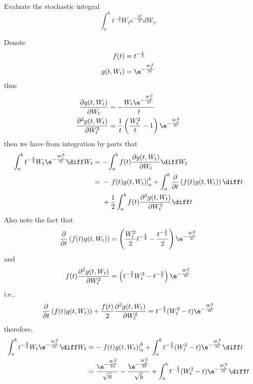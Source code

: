     \problem
    \begin{question}
        Evaluate the stochastic integral \[\int_a^b t^{-\frac{3}{2}}W_te^{-\frac{W^2_t}{2t}}dW_t.\]
    \end{question}
    Denote
    \[\begin{aligned}
        f(t)&=t^{-\frac{1}{2}}\\
        g(t,W_t)&=\e^{-\frac{W_t^2}{2t}}
    \end{aligned}\]
    thus
    \[\begin{aligned}
        \frac{\partial g(t,W_t)}{\partial W_t}
        &=-\frac{W_t\e^{-\frac{W_t^2}{2t}}}{t}\\
        \frac{\partial^2 g(t,W_t)}{\partial W_t^2}
        &=\frac{1}{t}\left(\frac{W_t^2}{t}-1\right)\e^{-\frac{W_t^2}{2t}}
    \end{aligned}\]
    then we have from integration by parts that
    \[\begin{aligned}
        \int_a^bt^{-\frac{3}{2}}W_t\e^{-\frac{W_t^2}{2t}}\diff W_t
        &=-\int_a^bf(t)\frac{\partial g(t,W_t)}{\partial W_t}\diff W_t\\
        &=\begin{aligned}[t]
        &-\left.f(t)g(t,W_t)\right|_a^b
         +\int_a^b\frac{\partial}{\partial t}\left(f(t)g(t,W_t)\right)\diff t\\
        &+\frac{1}{2}\int_a^bf(t)\frac{\partial^2g(t,W_t)}{\partial W_t^2}\diff t
        \end{aligned}
    \end{aligned}\]
    Also note the fact that
    \[\frac{\partial}{\partial t}\left(f(t)g(t,W_t)\right)
    =\left(\frac{W_t^2}{2}t^{-\frac{5}{2}}-\frac{t^{-\frac{3}{2}}}{2}\right)
    \e^{-\frac{W_t^2}{2t}}\]
    and
    \[f(t)\frac{\partial^2g(t,W_t)}{\partial W_t^2}
    =\left(t^{-\frac{5}{2}}W_t^2-t^{-\frac{3}{2}}\right)\e^{-\frac{W_t^2}{2t}}\]
    i.e.,
    \[\frac{\partial}{\partial t}\left(f(t)g(t,W_t)\right)
    +\frac{f(t)}{2}\frac{\partial^2g(t,W_t)}{\partial W_t^2}
    =t^{-\frac{5}{2}}(W_t^2-t)\e^{-\frac{W_t^2}{2t}}\]
    therefore,
    \[\begin{aligned}
        \int_a^bt^{-\frac{3}{2}}W_t\e^{-\frac{W_t^2}{2t}}\diff W_t
        &=-\left.f(t)g(t,W_t)\right|_a^b
        +\int_a^bt^{-\frac{5}{2}}(W_t^2-t)\e^{-\frac{W_t^2}{2t}}\diff t\\
        &=\frac{\e^{-\frac{W_a^2}{2a}}}{\sqrt a}
        -\frac{\e^{-\frac{W_b^2}{2b}}}{\sqrt b}
        +\int_a^bt^{-\frac{5}{2}}(W_t^2-t)\e^{-\frac{W_t^2}{2t}}\diff t\\
    \end{aligned}\]

